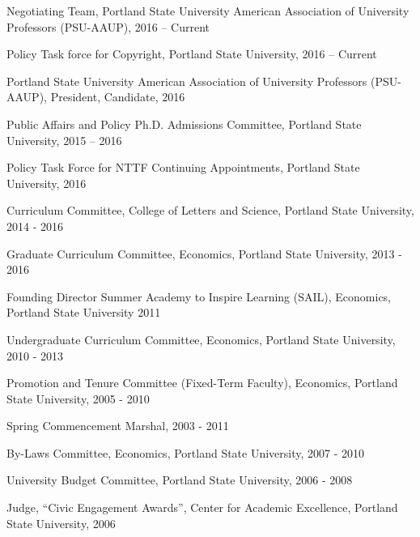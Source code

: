 \documentclass[Computer Science]{vita}
\begin{document}
\begin{vita}
\begin{Professional and Service Activities}
\begin{University}
    \item Negotiating Team, Portland State University American Association of University Professors (PSU-AAUP), 2016 -- Current
    
    \item Policy Task force for Copyright, Portland State University, 2016 -- Current
    
    \item Portland State University American Association of University Professors (PSU-AAUP), President, Candidate, 2016   
    
      \item Public Affairs and Policy Ph.D. Admissions Committee, Portland State University, 2015 -- 2016
      
      \item Policy Task Force for NTTF Continuing Appointments, Portland State University, 2016  
      
    \item Curriculum Committee, College of Letters and Science, Portland State University, 2014 - 2016
    
    
    
    \item Graduate Curriculum Committee, Economics, Portland State University, 2013 - 2016

\item Founding Director Summer Academy to Inspire Learning (SAIL), Economics, Portland State University 2011

    \item Undergraduate Curriculum Committee, Economics, Portland
      State University, 2010 - 2013

    \item Promotion and Tenure Committee (Fixed-Term Faculty),
      Economics, Portland State University, 2005 - 2010

    \item Spring Commencement Marshal, 2003 - 2011
  
    \item By-Laws Committee, Economics, Portland State University,
      2007 - 2010

    \item University Budget Committee, Portland State University, 2006
      - 2008

    \item Judge, ``Civic Engagement Awards'', Center for Academic
      Excellence, Portland State University, 2006


\end{University}
\end{Professional and Service Activities}
\end{vita}
\end{document}
